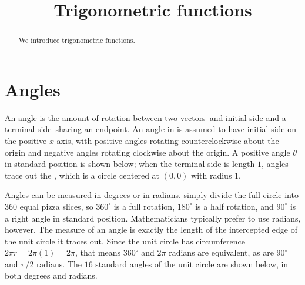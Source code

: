 \documentclass{ximera}
\title{Trigonometric functions}
\begin{document}
\begin{abstract}
  We introduce trigonometric functions.
\end{abstract}
\maketitle

\section{Angles}
An angle is the amount of rotation between two vectors--and initial side and a terminal side--sharing an endpoint. An angle in  is assumed to have initial side on the positive $x$-axis, with positive angles rotating counterclockwise about the origin and negative angles rotating clockwise about the origin. A positive angle $\theta$ in standard position is shown below; when the terminal side is length $1$, angles trace out the , which is a circle centered at $(0,0)$ with radius $1$.

\begin{image}[2in]
\end{image}

Angles can be measured in degrees or in radians.  simply divide the full circle into $360$ equal pizza slices, so $360^{\circ}$ is a full rotation, $180^{\circ}$ is a half rotation, and $90^{\circ}$ is a right angle in standard position. Mathematicians typically prefer to use radians, however. The  measure of an angle is exactly the length of the intercepted edge of the unit circle it traces out. Since the unit circle has circumference $2\pi r=2\pi(1)=2\pi$, that means $360^{\circ}$ and $2\pi$ radians are equivalent, as are $90^{\circ}$ and $\pi/2$ radians.  The $16$ standard angles of the unit circle are shown below, in both degrees and radians.
\end{document}
